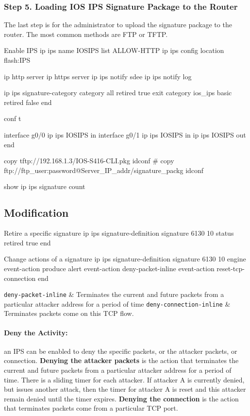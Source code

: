 \subsubsection{Step 5. Loading IOS IPS Signature Package to the Router}

The last step is for the administrator to upload the signature package to the router. The most common methods are FTP or TFTP. 

\begin{sexylisting}{Enable IPS}
ip ips name IOSIPS list ALLOW-HTTP
ip ips config location flash:IPS

ip http server
ip https server
ip ips notify sdee
ip ips notify log

ip ips signature-category
  category all
  retired true
exit
  category ios_ips basic
  retired false
end  

conf t

interface g0/0
  ip ips IOSIPS in
interface g0/1
  ip ips IOSIPS in
  ip ips IOSIPS out
end

copy tftp://192.168.1.3/IOS-S416-CLI.pkg idconf
# copy ftp://ftp_user:password@Server_IP_addr/signature_packg  idconf

show ip ips signature count 
\end{sexylisting}

\subsection{Modification}

\begin{sexylisting}{Retire a specific signature}
ip ips signature-definition
  signature 6130 10
  status
    retired true
end 
\end{sexylisting}

\begin{sexylisting}{Change actions of a signature}
ip ips signature-definition
  signature 6130 10
  engine
    event-action produce alert
    event-action deny-packet-inline
    event-action reset-tcp-connection
end    
\end{sexylisting}

\verb|deny-packet-inline| & Terminates the current and future packets from a particular attacker address for a period of time\w
\verb|deny-connection-inline| & Terminates packets come on this TCP flow.

\tableEnd

\paragraph{Deny the Activity:} an IPS can be enabled to deny the specific packets, or the attacker packets, or connection. \textbf{Denying the attacker packets} is the action that terminates the current and future packets from a particular attacker address for a period of time. There is a sliding timer for each attacker. If attacker A is currently denied, but issues another attack, then the timer for attacker A is reset and this attacker remain denied until the timer expires. \textbf{Denying the connection} is the action that terminates packets come from a particular TCP port.

